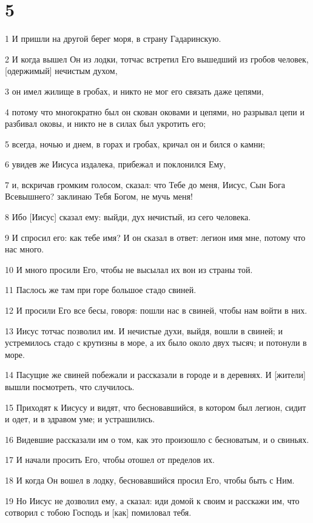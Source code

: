 \chapter{5}

\par 1 И пришли на другой берег моря, в страну Гадаринскую.
\par 2 И когда вышел Он из лодки, тотчас встретил Его вышедший из гробов человек, [одержимый] нечистым духом,
\par 3 он имел жилище в гробах, и никто не мог его связать даже цепями,
\par 4 потому что многократно был он скован оковами и цепями, но разрывал цепи и разбивал оковы, и никто не в силах был укротить его;
\par 5 всегда, ночью и днем, в горах и гробах, кричал он и бился о камни;
\par 6 увидев же Иисуса издалека, прибежал и поклонился Ему,
\par 7 и, вскричав громким голосом, сказал: что Тебе до меня, Иисус, Сын Бога Всевышнего? заклинаю Тебя Богом, не мучь меня!
\par 8 Ибо [Иисус] сказал ему: выйди, дух нечистый, из сего человека.
\par 9 И спросил его: как тебе имя? И он сказал в ответ: легион имя мне, потому что нас много.
\par 10 И много просили Его, чтобы не высылал их вон из страны той.
\par 11 Паслось же там при горе большое стадо свиней.
\par 12 И просили Его все бесы, говоря: пошли нас в свиней, чтобы нам войти в них.
\par 13 Иисус тотчас позволил им. И нечистые духи, выйдя, вошли в свиней; и устремилось стадо с крутизны в море, а их было около двух тысяч; и потонули в море.
\par 14 Пасущие же свиней побежали и рассказали в городе и в деревнях. И [жители] вышли посмотреть, что случилось.
\par 15 Приходят к Иисусу и видят, что бесновавшийся, в котором был легион, сидит и одет, и в здравом уме; и устрашились.
\par 16 Видевшие рассказали им о том, как это произошло с бесноватым, и о свиньях.
\par 17 И начали просить Его, чтобы отошел от пределов их.
\par 18 И когда Он вошел в лодку, бесновавшийся просил Его, чтобы быть с Ним.
\par 19 Но Иисус не дозволил ему, а сказал: иди домой к своим и расскажи им, что сотворил с тобою Господь и [как] помиловал тебя.
